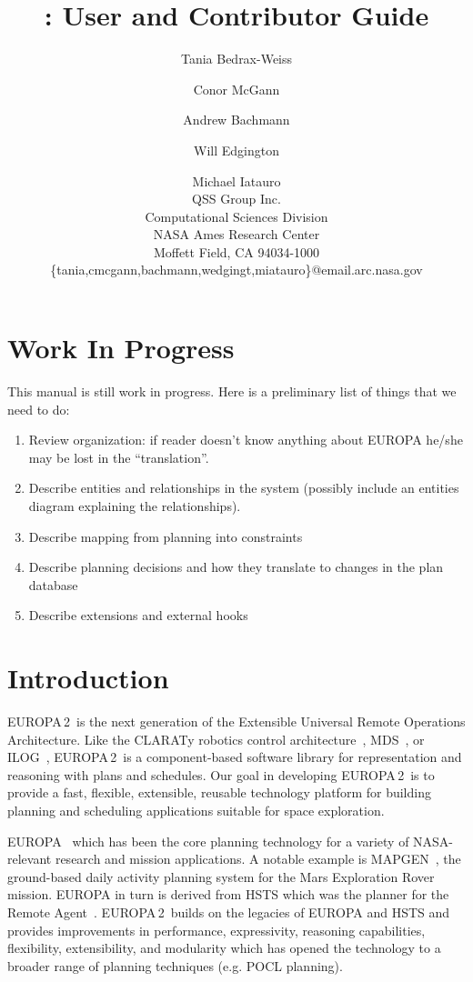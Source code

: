 \documentclass[10pt, letterpaper, twoside]{article}
\author{Tania Bedrax-Weiss \and Conor McGann \and Andrew Bachmann \and Will Edgington \and Michael Iatauro \\
QSS Group Inc. \\
Computational Sciences Division \\
NASA Ames Research Center \\
Moffett Field, CA 94034-1000 \\
\{tania,cmcgann,bachmann,wedgingt,miatauro\}@email.arc.nasa.gov
}
\title{\ET: User and Contributor Guide}
\begin{document}
\newcommand{\ET}{EUROPA\,2}

\maketitle

\tableofcontents

\section{Work In Progress}

This manual is still work in progress.  Here is a preliminary list of
things that we need to do:
\begin{enumerate}
 \item Review organization: if reader doesn't know anything about EUROPA
he/she may be lost in the ``translation''.
 \item Describe entities and relationships in the system (possibly include
an entities diagram explaining the relationships).
 \item Describe mapping from planning into constraints 
 \item Describe planning decisions and how they translate to changes in the
plan database
 \item Describe extensions and external hooks
\end{enumerate}

\section{Introduction}
\label{intro}
\ET\, is the next generation of the Extensible Universal Remote
Operations Architecture.  Like the CLARATy robotics control
architecture~\cite{kn:Ne}, MDS~\cite{MDS}, or ILOG~\cite{ILOG}, \ET\, is a 
component-based software library for representation and reasoning with
plans and schedules. Our goal in developing \ET\, is to provide a fast,
flexible, extensible, reusable technology platform for building planning
and scheduling applications suitable for space exploration.

EUROPA~\cite{caip,interplanetary} which has been the core planning
technology for a variety of NASA-relevant research and mission
applications. A notable example is MAPGEN~\cite{mapgen1,mapgen2}, the
ground-based daily activity planning system for the Mars Exploration Rover
mission. EUROPA in turn is derived from HSTS which was the planner for the
Remote Agent~\cite{rax}. \ET\, builds on the legacies of EUROPA and HSTS
and provides improvements in performance, expressivity, reasoning
capabilities, flexibility, extensibility, and modularity which has opened
the technology to a broader range of planning techniques (e.g. POCL
planning).
\end{document}

